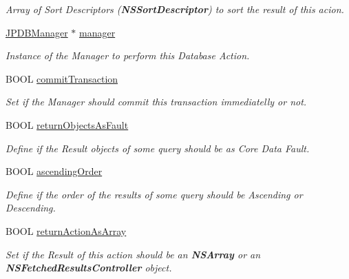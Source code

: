 \begin{DoxyCompactItemize}
\begin{DoxyCompactList}\small\item\em Array of Sort Descriptors ({\bfseries NSSortDescriptor}) to sort the result of this acion. \item\end{DoxyCompactList}\item 
\hypertarget{interface_j_p_d_b_manager_action_a675723939f92d5da2a8280e83bd0e1f0}{
\hyperlink{interface_j_p_d_b_manager}{JPDBManager} $\ast$ \hyperlink{interface_j_p_d_b_manager_action_a675723939f92d5da2a8280e83bd0e1f0}{manager}}
\label{interface_j_p_d_b_manager_action_a675723939f92d5da2a8280e83bd0e1f0}

\begin{DoxyCompactList}\small\item\em Instance of the Manager to perform this Database Action. \item\end{DoxyCompactList}\item 
BOOL \hyperlink{interface_j_p_d_b_manager_action_ad0060c13ad4e89eb23c60ad123250505}{commitTransaction}
\begin{DoxyCompactList}\small\item\em Set if the Manager should commit this transaction immediatelly or not. \item\end{DoxyCompactList}\item 
BOOL \hyperlink{interface_j_p_d_b_manager_action_ae603fd48edaea29a115b90a19f440ab8}{returnObjectsAsFault}
\begin{DoxyCompactList}\small\item\em Define if the Result objects of some query should be as Core Data Fault. \item\end{DoxyCompactList}\item 
BOOL \hyperlink{interface_j_p_d_b_manager_action_a0e153817018f1c41c7fa6bd5780ef09a}{ascendingOrder}
\begin{DoxyCompactList}\small\item\em Define if the order of the results of some query should be Ascending or Descending. \item\end{DoxyCompactList}\item 
BOOL \hyperlink{interface_j_p_d_b_manager_action_aecdffb5193789cbd3e4704e71c90972c}{returnActionAsArray}
\begin{DoxyCompactList}\small\item\em Set if the Result of this action should be an {\bfseries NSArray} or an {\bfseries NSFetchedResultsController} object. \item\end{DoxyCompactList}\end{DoxyCompactItemize}
